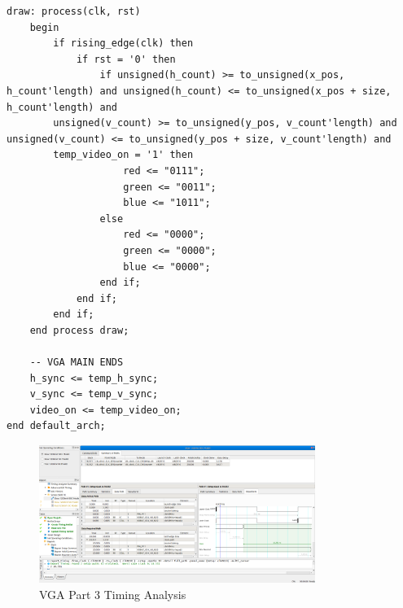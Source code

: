 \documentclass{article}
\begin{document}
\begin{lstlisting}[caption=VGA Entity for Part 3, label=lst:vga-entity-part-3]
	draw: process(clk, rst)
	begin
		if rising_edge(clk) then
			if rst = '0' then
				if unsigned(h_count) >= to_unsigned(x_pos, h_count'length) and unsigned(h_count) <= to_unsigned(x_pos + size, h_count'length) and
        unsigned(v_count) >= to_unsigned(y_pos, v_count'length) and unsigned(v_count) <= to_unsigned(y_pos + size, v_count'length) and
        temp_video_on = '1' then  
					red <= "0111";
					green <= "0011";
					blue <= "1011";
				else
					red <= "0000";
					green <= "0000";
					blue <= "0000";
				end if;
			end if;
		end if;
	end process draw;

	-- VGA MAIN ENDS
	h_sync <= temp_h_sync;
	v_sync <= temp_v_sync;
	video_on <= temp_video_on;
end default_arch;
\end{lstlisting}

\begin{figure}[H]
  \centering
  \label{fig:timing-analysis}
  \includegraphics[width=0.8\textwidth]{P4-Report-Timing-20ns.png}
  \caption{VGA Part 3 Timing Analysis}
\end{figure}
\end{document}
